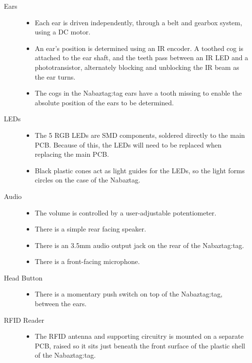 \documentclass[12pt, a4paper]{article}
\begin{document}
		\begin{description}
			\item[Ears]\hfill
				\begin{itemize}
					\item Each ear is driven independently, through a belt and gearbox system, using a \ac{DC} motor.
					\item An ear's position is determined using an \ac{IR} encoder. A toothed cog is attached to the ear shaft, and the teeth pass between an  \ac{IR} \ac{LED} and a phototransistor, alternately blocking and unblocking the \ac{IR} beam as the ear turns.
					\item The cogs in the Nabaztag:tag ears have a tooth missing to enable the absolute position  of the ears to be determined.
				\end{itemize}
			\item[\ac{LED}s]\hfill
				\begin{itemize}
					\item The 5 \ac{RGB} \ac{LED}s are \ac{SMD} components, soldered directly to the main \ac{PCB}. Because of this, the \ac{LED}s will need to be replaced when replacing the main \ac{PCB}.
					\item Black plastic cones act as light guides for the \ac{LED}s, so the light forms circles on the case of the Nabaztag.
				\end{itemize}
			\item[Audio]\hfill
				\begin{itemize}
					\item The volume is controlled by a user-adjustable potentiometer.
					\item There is a simple rear facing speaker.
					\item There is an 3.5mm audio output jack on the rear of the Nabaztag:tag.
					\item There is a front-facing microphone.
				\end{itemize}
			\newpage
			\item[Head Button]\hfill
				\begin{itemize}
					\item There is a momentary push switch on top of the Nabaztag:tag, between the ears.
				\end{itemize}
			\item[\ac{RFID} Reader]\hfill
				\begin{itemize}
					\item The \ac{RFID} antenna and supporting circuitry is mounted on a separate \ac{PCB}, raised so it sits just beneath the front surface of the plastic shell of the Nabaztag:tag.
				\end{itemize}
		\end{description}
		
\end{document}
